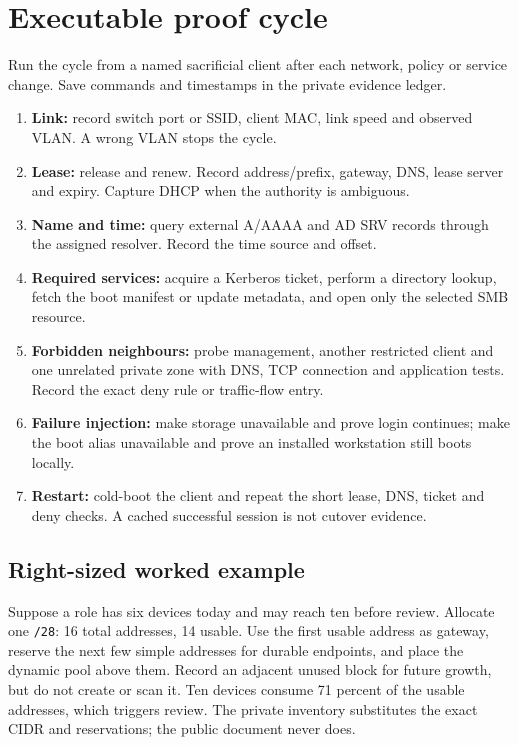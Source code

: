 \section{Executable proof cycle}
Run the cycle from a named sacrificial client after each network, policy or
service change.  Save commands and timestamps in the private evidence ledger.

\begin{enumerate}
\item \textbf{Link:} record switch port or SSID, client MAC, link speed and
observed VLAN.  A wrong VLAN stops the cycle.
\item \textbf{Lease:} release and renew.  Record address/prefix, gateway, DNS,
lease server and expiry.  Capture DHCP when the authority is ambiguous.
\item \textbf{Name and time:} query external A/AAAA and AD SRV records through
the assigned resolver.  Record the time source and offset.
\item \textbf{Required services:} acquire a Kerberos ticket, perform a directory
lookup, fetch the boot manifest or update metadata, and open only the selected
SMB resource.
\item \textbf{Forbidden neighbours:} probe management, another restricted
client and one unrelated private zone with DNS, TCP connection and application
tests.  Record the exact deny rule or traffic-flow entry.
\item \textbf{Failure injection:} make storage unavailable and prove login
continues; make the boot alias unavailable and prove an installed workstation
still boots locally.
\item \textbf{Restart:} cold-boot the client and repeat the short lease, DNS,
ticket and deny checks.  A cached successful session is not cutover evidence.
\end{enumerate}

\subsection*{Right-sized worked example}
Suppose a role has six devices today and may reach ten before review.  Allocate
one \texttt{/28}: 16 total addresses, 14 usable.  Use the first usable address
as gateway, reserve the next few simple addresses for durable endpoints, and
place the dynamic pool above them.  Record an adjacent unused block for future
growth, but do not create or scan it.  Ten devices consume 71 percent of the
usable addresses, which triggers review.  The private inventory substitutes
the exact CIDR and reservations; the public document never does.

